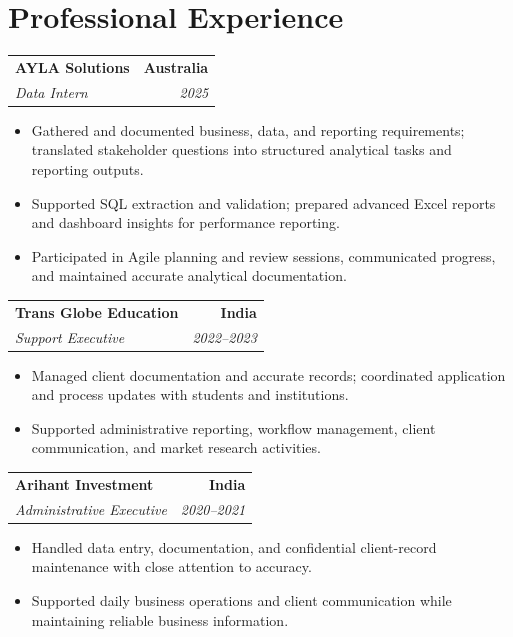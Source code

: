 \documentclass[letterpaper,10pt]{article}
\makeatletter
\newcommand{\role}[4]{%
  \begin{tabularx}{\textwidth}{@{}Xr@{}}
    \textbf{#1} & \textbf{#2} \\
    \textit{#3} & \textit{#4}
  \end{tabularx}\vspace{-1pt}
}
\makeatother
\begin{document}
\section{Professional Experience}
\role{AYLA Solutions}{Australia}{Data Intern}{2025}
\begin{itemize}
  \item Gathered and documented business, data, and reporting requirements; translated stakeholder questions into structured analytical tasks and reporting outputs.
  \item Supported SQL extraction and validation; prepared advanced Excel reports and dashboard insights for performance reporting.
  \item Participated in Agile planning and review sessions, communicated progress, and maintained accurate analytical documentation.
\end{itemize}
\vspace{1pt}

\role{Trans Globe Education}{India}{Support Executive}{2022--2023}
\begin{itemize}
  \item Managed client documentation and accurate records; coordinated application and process updates with students and institutions.
  \item Supported administrative reporting, workflow management, client communication, and market research activities.
\end{itemize}
\vspace{1pt}

\role{Arihant Investment}{India}{Administrative Executive}{2020--2021}
\begin{itemize}
  \item Handled data entry, documentation, and confidential client-record maintenance with close attention to accuracy.
  \item Supported daily business operations and client communication while maintaining reliable business information.
\end{itemize}
\end{document}
